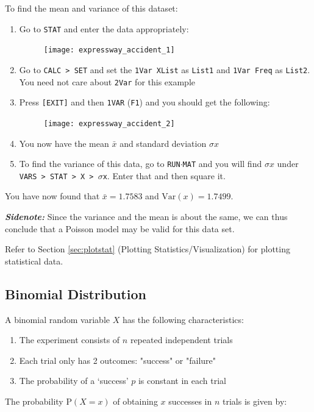 \documentclass[a5paper]{memoir}
\def\code#1{\texttt{#1}}
\newenvironment{sidenote}%
{\textcolor[HTML]{00559e}{\textbf{\textit{Sidenote:}}} \color[HTML]{3c90d8}}%
{\ignorespacesafterend}
\def\runmat{\code{RUN$\cdot$MAT} }
\def\Fone{(\code{F1}) }
\begin{document}
To find the mean and variance of this dataset:
\begin{enumerate}
	\item Go to \code{STAT} and enter the data appropriately:
	\begin{figure}[h]
		\centering
		\texttt{[image: expressway\_accident\_1]}
	\end{figure}
	\item Go to \code{CALC > SET} and set the \code{1Var XList} as \code{List1} and \code{1Var Freq} as \code{List2}. You need not care about \code{2Var} for this example
	\item Press \code{[EXIT]} and then \code{1VAR} \Fone and you should get the following:
	\begin{figure}[h]
		\centering
		\texttt{[image: expressway\_accident\_2]}
	\end{figure}
	\item You now have the mean $\bar{x}$ and standard deviation $\sigma x$
	\item To find the variance of this data, go to \runmat and you will find $\sigma x$ under \code{VARS > STAT > X > $\sigma$x}. Enter that and then square it.	
\end{enumerate}

You have now found that $\bar{x} = 1.7583$ and $\text{Var}(x)=1.7499$. 

\begin{sidenote}
	Since the variance and the mean is about the same, we can thus conclude that a Poisson model may be valid for this data set.
\end{sidenote}

Refer to Section \ref{sec:plotstat} (Plotting Statistics/Visualization) for plotting statistical data.

\subsection{Binomial Distribution} \label{sec:binom}
A binomial random variable $X$ has the following characteristics:
\begin{enumerate}
	\item The experiment consists of $n$ repeated independent trials
	\item Each trial only has 2 outcomes: "success" or "failure"
	\item The probability of a `success' $p$ is constant in each trial
\end{enumerate}

The probability $\textrm{P}(X = x)$ of obtaining $x$ successes in $n$ trials is given by:
\end{document}
